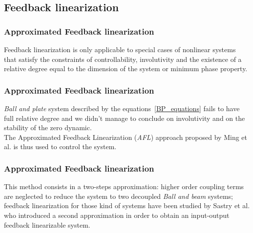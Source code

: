 \subsection{Feedback linearization}
\begin{frame}
\frametitle{Approximated Feedback linearization}
Feedback linearization is only applicable to special cases of nonlinear systems that satisfy the constraints of controllability, involutivity and the existence of a relative degree equal to the dimension of the system or minimum phase property.
\end{frame}
%
\begin{frame}
\frametitle{Approximated Feedback linearization}
\textit{Ball and plate} system described by the equations~\ref{BP_equations} fails to have full relative degree and we didn't manage to conclude on involutivity and on the stability of the zero dynamic.\\ The Approximated Feedback Linearization (\textit{AFL}) approach proposed by Ming et al. is thus used to control the system.
\end{frame}
%
\begin{frame}
\frametitle{Approximated Feedback linearization}
This method consists in a two-steps approximation: higher order coupling terms are neglected to reduce the system to two decoupled \textit{Ball and beam} systems; feedback linearization for those kind of systems have been studied by Sastry et al.  who introduced a second approximation in order to obtain an input-output feedback linearizable system.
\end{frame}
%
